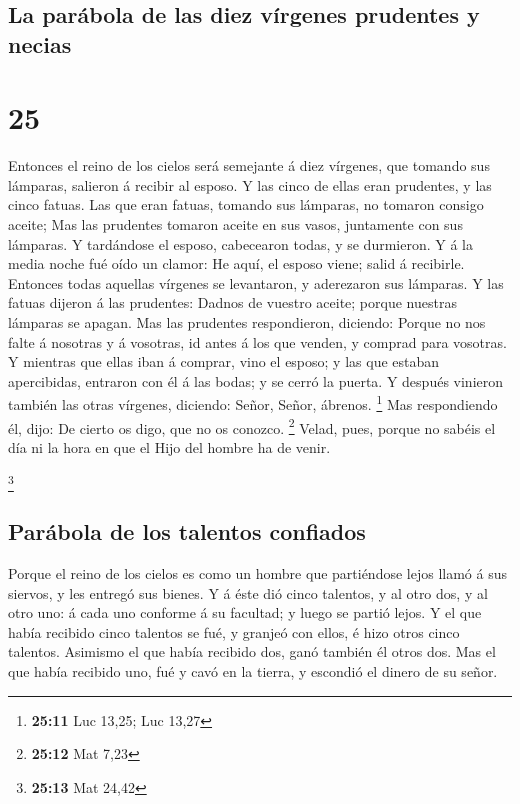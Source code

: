 \hypertarget{la-paruxe1bola-de-las-diez-vuxedrgenes-prudentes-y-necias}{%
\subsection{La parábola de las diez vírgenes prudentes y
necias}\label{la-paruxe1bola-de-las-diez-vuxedrgenes-prudentes-y-necias}}

\hypertarget{section-24}{%
\section{25}\label{section-24}}

 Entonces el reino de los cielos será semejante á diez
vírgenes, que tomando sus lámparas, salieron á recibir al esposo.
 Y las cinco de ellas eran prudentes, y las cinco fatuas.
 Las que eran fatuas, tomando sus lámparas, no tomaron
consigo aceite;  Mas las prudentes tomaron aceite en sus
vasos, juntamente con sus lámparas.  Y tardándose el esposo,
cabecearon todas, y se durmieron.  Y á la media noche fué
oído un clamor: He aquí, el esposo viene; salid á recibirle.
 Entonces todas aquellas vírgenes se levantaron, y
aderezaron sus lámparas.  Y las fatuas dijeron á las
prudentes: Dadnos de vuestro aceite; porque nuestras lámparas se apagan.
 Mas las prudentes respondieron, diciendo: Porque no nos
falte á nosotras y á vosotras, id antes á los que venden, y comprad para
vosotras.  Y mientras que ellas iban á comprar, vino el
esposo; y las que estaban apercibidas, entraron con él á las bodas; y se
cerró la puerta.  Y después vinieron también las otras
vírgenes, diciendo: Señor, Señor, ábrenos. \footnote{\textbf{25:11} Luc
  13,25; Luc 13,27}  Mas respondiendo él, dijo: De cierto
os digo, que no os conozco. \footnote{\textbf{25:12} Mat 7,23}
 Velad, pues, porque no sabéis el día ni la hora en que el
Hijo del hombre ha de venir.

\footnote{\textbf{25:13} Mat 24,42}

\hypertarget{paruxe1bola-de-los-talentos-confiados}{%
\subsection{Parábola de los talentos
confiados}\label{paruxe1bola-de-los-talentos-confiados}}

 Porque el reino de los cielos es como un hombre que
partiéndose lejos llamó á sus siervos, y les entregó sus bienes.
 Y á éste dió cinco talentos, y al otro dos, y al otro uno:
á cada uno conforme á su facultad; y luego se partió lejos.
 Y el que había recibido cinco talentos se fué, y granjeó
con ellos, é hizo otros cinco talentos.  Asimismo el que
había recibido dos, ganó también él otros dos.  Mas el que
había recibido uno, fué y cavó en la tierra, y escondió el dinero de su
señor.

